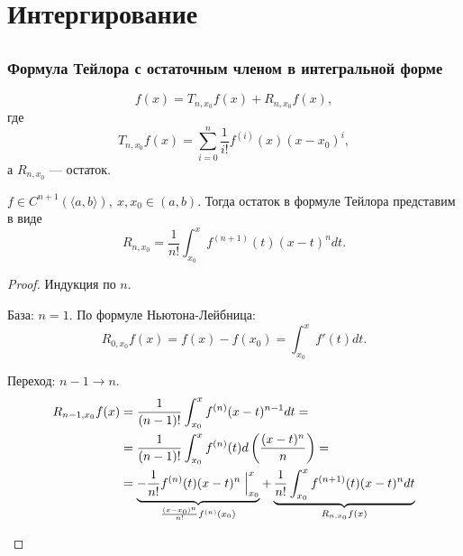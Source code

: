 % 
% 

\chapter{Интергирование}
\section{}

\subsection{Формула Тейлора с остаточным членом в интегральной форме}
\[
    f(x)  = T_{n, x_0} f(x) + R_{n, x_0} f(x) 
,\] 
где 
\[
    T_{n, x_0} f(x) = \sum_{i=0}^{n} \frac{1}{i!} f^{(i)}(x) (x-x_0)^{i}
,\] 
а $ R_{n, x_0}$ --- остаток.
\begin{thm}
    $ f \in  C^{n+1} (\langle a, b \rangle), ~ x, x_0 \in  (a, b)$. Тогда остаток в формуле Тейлора представим в виде
    \[
	R_{n, x_0} =\frac{1}{n!} \int_{x_0}^{x} f^{(n+1)}(t) (x-t)^{n} dt 
    .\] 
\end{thm}
\begin{proof}
    Индукция по $n$.
    $ $
    \begin{description}
        \item База: $ n=1$. 
	    По формуле Ньютона-Лейбница:
	    \[
		R_{0, x_0} f(x) = f(x) - f(x_0) = \int_{x_0}^{x} f'(t) dt 
	    .\] 
        \item Переход: $ n-1 \to n$. 
	    \begin{align*}
		R_{n-1, x_0} f(x) &= \frac{1}{(n-1)!} \int_{x_0}^{x} f^{(n)}(x-t)^{n-1}dt = \\
				  & = \frac{1}{(n-1)!} \int_{x_0}^{x}  f^{(n)}(t) d \left( \frac{(x-t)^{n}}{n} \right)  = \\
				  & = \underbrace{-\frac{1}{n!} f^{(n)}(t)(x-t)^{n} \Bigm |_{x_0}^{x}}_{\frac{(x-x_0)^{n}}{n!} f^{(n)}(x_0)} + \underbrace{\frac{1}{n!}  \int_{x_0}^{x} f^{(n+1)}(t) (x-t)^{n}dt}_{R_{n, x_0}f(x)}
	    \end{align*}
    \end{description} 
\end{proof}
